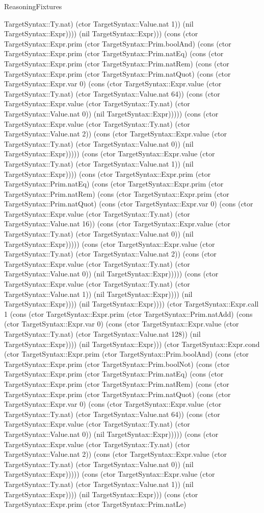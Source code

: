 \begin{lexlean}{ReasoningFixtures}
\begin{semanticmodule}
{TargetSyntax::Ty.nat) (ctor TargetSyntax::Value.nat 1)) (nil TargetSyntax::Expr)))) (nil TargetSyntax::Expr))) (cons (ctor TargetSyntax::Expr.prim (ctor TargetSyntax::Prim.boolAnd) (cons (ctor TargetSyntax::Expr.prim (ctor TargetSyntax::Prim.natEq) (cons (ctor TargetSyntax::Expr.prim (ctor TargetSyntax::Prim.natRem) (cons (ctor TargetSyntax::Expr.prim (ctor TargetSyntax::Prim.natQuot) (cons (ctor TargetSyntax::Expr.var 0) (cons (ctor TargetSyntax::Expr.value (ctor TargetSyntax::Ty.nat) (ctor TargetSyntax::Value.nat 64)) (cons (ctor TargetSyntax::Expr.value (ctor TargetSyntax::Ty.nat) (ctor TargetSyntax::Value.nat 0)) (nil TargetSyntax::Expr))))) (cons (ctor TargetSyntax::Expr.value (ctor TargetSyntax::Ty.nat) (ctor TargetSyntax::Value.nat 2)) (cons (ctor TargetSyntax::Expr.value (ctor TargetSyntax::Ty.nat) (ctor TargetSyntax::Value.nat 0)) (nil TargetSyntax::Expr))))) (cons (ctor TargetSyntax::Expr.value (ctor TargetSyntax::Ty.nat) (ctor TargetSyntax::Value.nat 1)) (nil TargetSyntax::Expr)))) (cons (ctor TargetSyntax::Expr.prim (ctor TargetSyntax::Prim.natEq) (cons (ctor TargetSyntax::Expr.prim (ctor TargetSyntax::Prim.natRem) (cons (ctor TargetSyntax::Expr.prim (ctor TargetSyntax::Prim.natQuot) (cons (ctor TargetSyntax::Expr.var 0) (cons (ctor TargetSyntax::Expr.value (ctor TargetSyntax::Ty.nat) (ctor TargetSyntax::Value.nat 16)) (cons (ctor TargetSyntax::Expr.value (ctor TargetSyntax::Ty.nat) (ctor TargetSyntax::Value.nat 0)) (nil TargetSyntax::Expr))))) (cons (ctor TargetSyntax::Expr.value (ctor TargetSyntax::Ty.nat) (ctor TargetSyntax::Value.nat 2)) (cons (ctor TargetSyntax::Expr.value (ctor TargetSyntax::Ty.nat) (ctor TargetSyntax::Value.nat 0)) (nil TargetSyntax::Expr))))) (cons (ctor TargetSyntax::Expr.value (ctor TargetSyntax::Ty.nat) (ctor TargetSyntax::Value.nat 1)) (nil TargetSyntax::Expr)))) (nil TargetSyntax::Expr)))) (nil TargetSyntax::Expr)))) (ctor TargetSyntax::Expr.call 1 (cons (ctor TargetSyntax::Expr.prim (ctor TargetSyntax::Prim.natAdd) (cons (ctor TargetSyntax::Expr.var 0) (cons (ctor TargetSyntax::Expr.value (ctor TargetSyntax::Ty.nat) (ctor TargetSyntax::Value.nat 128)) (nil TargetSyntax::Expr)))) (nil TargetSyntax::Expr))) (ctor TargetSyntax::Expr.cond (ctor TargetSyntax::Expr.prim (ctor TargetSyntax::Prim.boolAnd) (cons (ctor TargetSyntax::Expr.prim (ctor TargetSyntax::Prim.boolNot) (cons (ctor TargetSyntax::Expr.prim (ctor TargetSyntax::Prim.natEq) (cons (ctor TargetSyntax::Expr.prim (ctor TargetSyntax::Prim.natRem) (cons (ctor TargetSyntax::Expr.prim (ctor TargetSyntax::Prim.natQuot) (cons (ctor TargetSyntax::Expr.var 0) (cons (ctor TargetSyntax::Expr.value (ctor TargetSyntax::Ty.nat) (ctor TargetSyntax::Value.nat 64)) (cons (ctor TargetSyntax::Expr.value (ctor TargetSyntax::Ty.nat) (ctor TargetSyntax::Value.nat 0)) (nil TargetSyntax::Expr))))) (cons (ctor TargetSyntax::Expr.value (ctor TargetSyntax::Ty.nat) (ctor TargetSyntax::Value.nat 2)) (cons (ctor TargetSyntax::Expr.value (ctor TargetSyntax::Ty.nat) (ctor TargetSyntax::Value.nat 0)) (nil TargetSyntax::Expr))))) (cons (ctor TargetSyntax::Expr.value (ctor TargetSyntax::Ty.nat) (ctor TargetSyntax::Value.nat 1)) (nil TargetSyntax::Expr)))) (nil TargetSyntax::Expr))) (cons (ctor TargetSyntax::Expr.prim (ctor TargetSyntax::Prim.natLe) }
\end{semanticmodule}
\end{lexlean}
